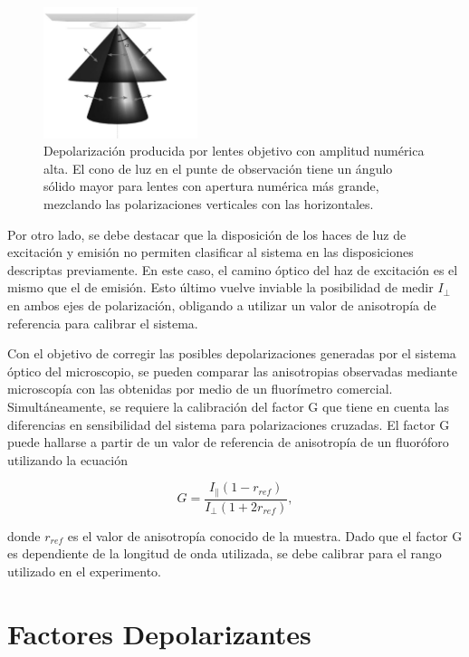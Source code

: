 \begin{figure}
    \centering
    \includegraphics[width=0.4\textwidth]{./img/NA.png}
    \caption{Depolarización producida por lentes objetivo con amplitud numérica alta. El cono de luz en el punte de observación tiene un ángulo sólido mayor para lentes con apertura numérica más grande, mezclando las polarizaciones verticales con las horizontales\cite{Chan2011}.}
    \label{fig:NA}
\end{figure}

Por otro lado, se debe destacar que la disposición de los haces de luz de excitación y emisión no permiten clasificar al sistema en las disposiciones descriptas previamente. En este caso, el camino óptico del haz de excitación es el mismo que el de emisión. Esto último vuelve inviable la posibilidad de medir $I_{\perp}$ en ambos ejes de polarización, obligando a utilizar un valor de anisotropía de referencia para calibrar el sistema.

Con el objetivo de corregir las posibles depolarizaciones generadas por el sistema óptico del microscopio, se pueden comparar las anisotropias observadas mediante microscopía con las obtenidas por medio de un fluorímetro comercial. Simultáneamente, se requiere la calibración del factor G que tiene en cuenta las diferencias en sensibilidad del sistema para polarizaciones cruzadas. El factor G puede hallarse a partir de un valor de referencia de anisotropía de un fluoróforo utilizando la ecuación

\begin{equation}
    G = \frac{I_{\parallel} (1 - r_{ref})}{I_{\perp} (1 + 2r_{ref})},
\end{equation}

\noindent donde $r_{ref}$ es el valor de anisotropía conocido de la muestra. Dado que el factor G es dependiente de la longitud de onda utilizada, se debe calibrar para el rango utilizado en el experimento.



\section{Factores Depolarizantes}


